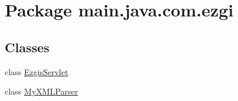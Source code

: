 \hypertarget{namespacemain_1_1java_1_1com_1_1ezgi}{}\section{Package main.\+java.\+com.\+ezgi}
\label{namespacemain_1_1java_1_1com_1_1ezgi}
\subsection*{Classes}
\begin{DoxyCompactItemize}
\item 
class \hyperlink{classmain_1_1java_1_1com_1_1ezgi_1_1_ezgis_servlet}{Ezgis\+Servlet}
\item 
class \hyperlink{classmain_1_1java_1_1com_1_1ezgi_1_1_my_x_m_l_parser}{My\+X\+M\+L\+Parser}
\end{DoxyCompactItemize}
